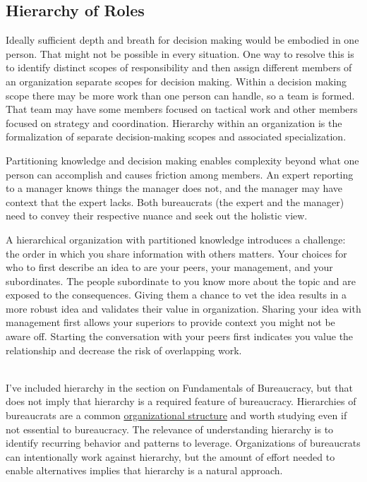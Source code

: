 \subsection*{Hierarchy of Roles\label{sec:hierarchy-of-roles}}

Ideally sufficient depth and breath for decision making would be embodied in one person. That might not be possible in every situation. One way to resolve this is to identify distinct scopes of responsibility and then assign different members of an organization separate scopes for decision making. Within a decision making scope there may be more work than one person can handle, so a team is formed. That team may have some members focused on tactical work and other members focused on strategy and coordination. Hierarchy within an organization is the formalization of separate decision-making scopes and associated specialization. 

Partitioning knowledge and decision making enables complexity beyond what one person can accomplish and causes friction among members. An expert reporting to a manager knows things the manager does not, and the manager may have context that the expert lacks. Both bureaucrats (the expert and the manager) need to convey their respective nuance and seek out the holistic view.

A hierarchical organization with partitioned knowledge introduces a challenge: the order in which you share information with others matters. Your choices for who to first describe an idea to are your peers, your management, and your subordinates. 
The people subordinate to you know more about the topic and are exposed to the consequences. Giving them a chance to vet the idea results in a more robust idea and validates their value in organization. Sharing your idea with management first allows your superiors to provide context you might not be aware off. Starting the conversation with your peers first indicates you value the relationship and decrease the risk of overlapping work.

\ \\

I've included hierarchy in the section on Fundamentals of Bureaucracy, but that does not imply that hierarchy is a required feature of bureaucracy. Hierarchies of bureaucrats are a common \href{https://en.wikipedia.org/wiki/Organizational_structure}{organizational structure} and  worth studying even if not essential to bureaucracy. The relevance of understanding hierarchy is to identify recurring behavior and patterns to leverage.
Organizations of bureaucrats can intentionally work against hierarchy, but the amount of effort needed to enable alternatives implies that hierarchy is a natural approach.

